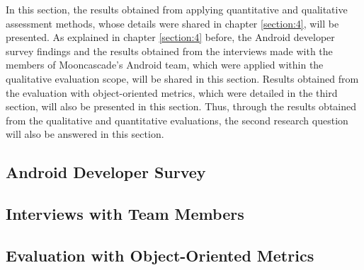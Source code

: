 In this section, the results obtained from applying quantitative and qualitative assessment methods, whose details were shared in chapter \ref{section:4}, will be presented. As explained in chapter \ref{section:4} before, the Android developer survey findings and the results obtained from the interviews made with the members of Mooncascade's Android team, which were applied within the qualitative evaluation scope, will be shared in this section. Results obtained from the evaluation with object-oriented metrics, which were detailed in the third section, will also be presented in this section. Thus, through the results obtained from the qualitative and quantitative evaluations, the second research question will also be answered in this section.

\subsection{Android Developer Survey}
\label{section:5.1}


\subsection{Interviews with Team Members}


\subsection{Evaluation with Object-Oriented Metrics}
